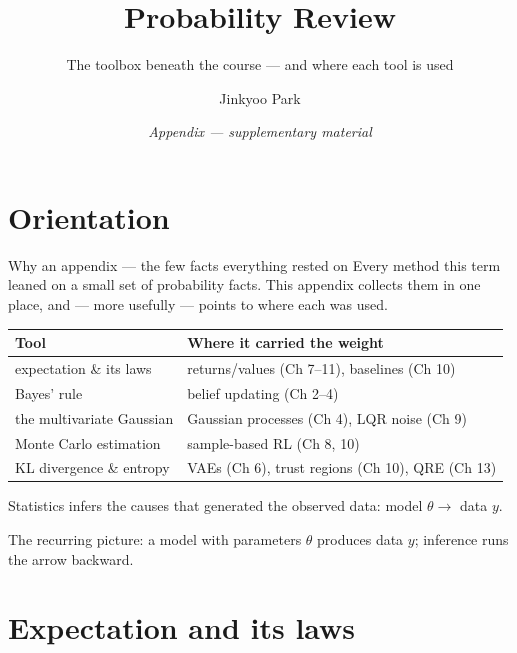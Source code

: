 \documentclass[10pt, aspectratio=169]{beamer}
\title{Probability Review}
\subtitle{The toolbox beneath the course --- and where each tool is used}
\author{Jinkyoo Park}
\institute{KAIST}
\date{\textit{Appendix --- supplementary material}}
\begin{document}
\maketitle

\section{Orientation}

\begin{frame}{Why an appendix --- the few facts everything rested on}
Every method this term leaned on a small set of probability facts. This appendix collects them in one place, and --- more usefully --- \alert{points to where each was used}.
\medskip

\pause
\begin{center}\footnotesize\renewcommand{\arraystretch}{1.4}
\begin{tabular}{l|l}
\textbf{Tool} & \textbf{Where it carried the weight} \\
\hline
expectation \& its laws & returns/values (Ch 7--11), baselines (Ch 10) \\
Bayes' rule & belief updating (Ch 2--4) \\
the multivariate Gaussian & \alert{Gaussian processes} (Ch 4), LQR noise (Ch 9) \\
Monte Carlo estimation & sample-based RL (Ch 8, 10) \\
KL divergence \& entropy & VAEs (Ch 6), trust regions (Ch 10), QRE (Ch 13) \\
\end{tabular}
\end{center}
\medskip

\pause
\begin{center}\large
\alert{Statistics infers the causes that generated the observed data:} model $\theta \to$ data $y$.
\end{center}
The recurring picture: a model with parameters $\theta$ produces data $y$; inference runs the arrow backward.
\end{frame}

\section{Expectation and its laws}
\end{document}
